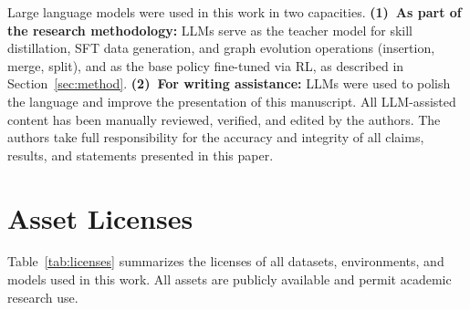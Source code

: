 Large language models were used in this work in two capacities. \textbf{(1)~As part of the research methodology:} LLMs serve as the teacher model for skill distillation, SFT data generation, and graph evolution operations (insertion, merge, split), and as the base policy fine-tuned via RL, as described in Section~\ref{sec:method}. \textbf{(2)~For writing assistance:} LLMs were used to polish the language and improve the presentation of this manuscript. All LLM-assisted content has been manually reviewed, verified, and edited by the authors. The authors take full responsibility for the accuracy and integrity of all claims, results, and statements presented in this paper.

\section{Asset Licenses}
\label{app:licenses}

Table~\ref{tab:licenses} summarizes the licenses of all datasets, environments, and models used in this work. All assets are publicly available and permit academic research use.

